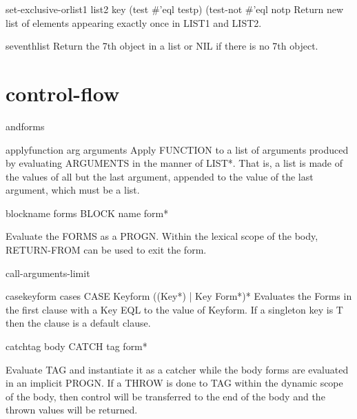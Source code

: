\begin{function}{set-exclusive-or}{list1 list2 \key key (test #'eql testp) (test-not #'eql notp}{}
  Return new list of elements appearing exactly once in LIST1 and LIST2.
\end{function}

\begin{accessor}{seventh}{list}{}
  Return the 7th object in a list or NIL if there is no 7th object.
\end{accessor}

\section{control-flow}

\begin{macro}{and}{\rest forms}{}
  
\end{macro}

\begin{function}{apply}{function arg \rest arguments}{}
  Apply FUNCTION to a list of arguments produced by evaluating ARGUMENTS in
  the manner of LIST*. That is, a list is made of the values of all but the
  last argument, appended to the value of the last argument, which must be a
  list.
\end{function}

\begin{specialop}{block}{name \rest forms}{}
  BLOCK name form*

Evaluate the FORMS as a PROGN. Within the lexical scope of the body,
RETURN-FROM can be used to exit the form.
\end{specialop}

\begin{constant}{call-arguments-limit}{}{}
  
\end{constant}

\begin{macro}{case}{keyform \body cases}{}
  CASE Keyform {({(Key*) | Key} Form*)}*
  Evaluates the Forms in the first clause with a Key EQL to the value of
  Keyform. If a singleton key is T then the clause is a default clause.
\end{macro}

\begin{specialop}{catch}{tag \body body}{}
  CATCH tag form*

Evaluate TAG and instantiate it as a catcher while the body forms are
evaluated in an implicit PROGN. If a THROW is done to TAG within the dynamic
scope of the body, then control will be transferred to the end of the body and
the thrown values will be returned.
\end{specialop}

